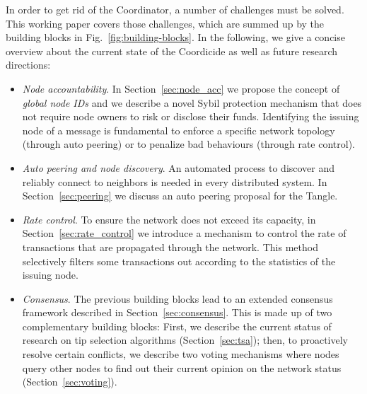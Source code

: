 \documentclass[../main.tex]{subfiles}
\begin{document}
In order to get rid of the Coordinator, a number of challenges must be solved. This working paper covers those challenges, which are summed up by the building blocks in Fig.~\ref{fig:building-blocks}. In the following, we give a concise overview about the current state of the Coordicide as well as future research directions:
\begin{itemize}
    \item \textit{Node accountability}. In Section~\ref{sec:node_acc} we propose the concept of \emph{global node IDs} and we describe a novel Sybil protection mechanism that does not require node owners to risk or disclose their funds. Identifying the issuing node of a message is fundamental to enforce a specific network topology (through auto peering) or to penalize bad behaviours (through rate control).
    
    \item \textit{Auto peering and node discovery}. 
    An automated process to discover and reliably connect to neighbors is needed in every distributed system. In Section~\ref{sec:peering} we discuss an auto peering proposal for the Tangle.

    \item \textit{Rate control}.
    To ensure the network does not exceed its capacity, in Section~\ref{sec:rate_control} we introduce a mechanism to control the rate of transactions that are propagated through the network. This method selectively filters some transactions out according to the statistics of the issuing node.
    
    \item \textit{Consensus}.
    The previous building blocks lead to an extended consensus framework described in Section~\ref{sec:consensus}. This is made up of two complementary building blocks: First, we describe the current status of research on tip selection algorithms (Section~\ref{sec:tsa}); then, to proactively resolve certain conflicts, we describe two voting mechanisms where nodes query other nodes to find out their current opinion on the network status (Section~\ref{sec:voting}).
\end{itemize}
\end{document}
